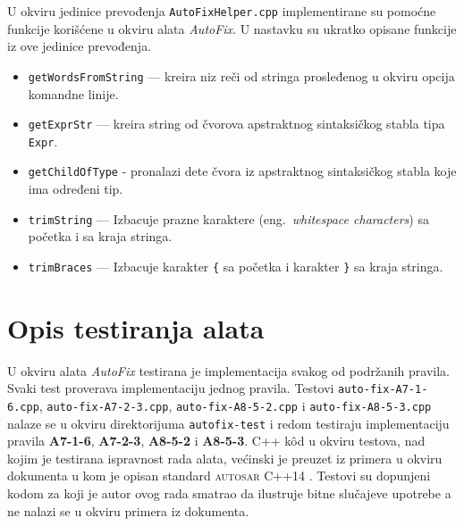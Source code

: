 \documentclass[12pt,oneside]{memoir}
\begin{document}
U okviru jedinice prevođenja \texttt{AutoFixHelper.cpp} implementirane su pomo\'{c}ne funkcije kori\v{s}\'{c}ene u okviru alata \textit{AutoFix}. U nastavku su ukratko opisane funkcije iz ove jedinice prevođenja.
\begin{itemize}
  \item \texttt{getWordsFromString} --- kreira niz re\v{c}i od stringa prosleđenog u okviru opcija komandne linije.
  \item \texttt{getExprStr} --- kreira string od \v{c}vorova apstraktnog sintaksi\v{c}kog stabla tipa \texttt{Expr}.
  \item \texttt{getChildOfType} - pronalazi dete \v{c}vora iz apstraktnog sintaksi\v{c}kog stabla koje ima određeni tip.
  \item \texttt{trimString} --- Izbacuje prazne karaktere (eng.~\textit{whitespace characters}) sa po\v{c}etka i sa kraja stringa.
  \item \texttt{trimBraces} --- Izbacuje karakter \texttt{\{} sa po\v{c}etka i karakter \texttt{\}} sa kraja stringa.
\end{itemize}

\section{Opis testiranja alata}

U okviru alata \textit{AutoFix} testirana je implementacija svakog od podr\v{z}anih pravila. Svaki test proverava implementaciju jednog pravila.
Testovi \texttt{auto-fix-A7-1-6\-.cpp}, \texttt{auto-fix-A7-2-3.cpp}, \texttt{auto-fix-A8-5-2.cpp} i \texttt{auto-fix-A8-5-3.cpp} nalaze se u okviru direktorijuma \texttt{autofix-test} i redom testiraju implementaciju pravila
\textbf{A7-1-6}, \textbf{A7-2-3}, \textbf{A8-5-2} i \textbf{A8-5-3}. C++ k\^{o}d u okviru testova, nad kojim je testirana ispravnost rada alata, ve\'c{i}nski je preuzet iz primera u okviru dokumenta u kom je opisan standard \textsc{autosar} C++14 \cite{AutosarGuidelines}. Testovi su dopunjeni kodom za koji je autor ovog rada smatrao da ilustruje bitne  slu\v{c}ajeve upotrebe a ne nalazi se u okviru primera iz dokumenta.
\end{document}
